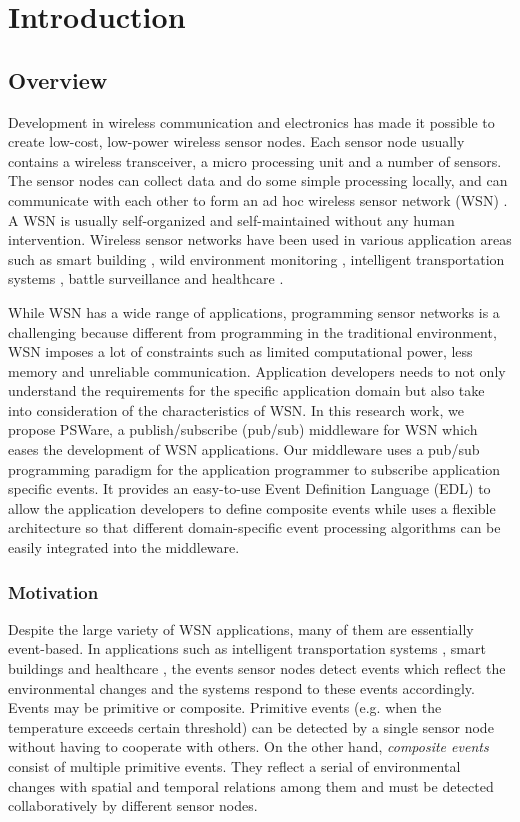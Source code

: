 \chapter{Introduction}
\section{Overview}
\label{sec:introduction}
Development in wireless communication and electronics has made it possible to create low-cost, low-power wireless sensor nodes. Each sensor node usually contains a wireless transceiver, a micro processing unit and a number of sensors. The sensor nodes can collect data and do some simple processing locally, and can communicate with each other to form an ad hoc wireless sensor network (WSN) \cite{aky:survey}. A WSN is usually self-organized and self-maintained without any human intervention. Wireless sensor networks have been used in various application areas such as smart building \cite{lynch:shm}, wild environment monitoring \cite{wsnhabitat}, intelligent transportation systems \cite{klein:its}, battle surveillance \cite{wsntracking} and healthcare \cite{lo:ban}. 

While WSN has a wide range of applications, programming sensor networks is a challenging because different from programming in the traditional environment, WSN imposes a lot of constraints such as limited computational power, less memory and unreliable communication. Application developers needs to not only understand the requirements for the specific application domain but also take into consideration of the characteristics of WSN. In this research work, we propose PSWare, a publish/subscribe (pub/sub) middleware for WSN which eases the development of WSN applications. Our middleware uses a pub/sub programming paradigm for the application programmer to subscribe application specific events. It provides an easy-to-use Event Definition Language (EDL) to allow the application developers to define composite events while uses a flexible architecture so that different domain-specific event processing algorithms can be easily integrated into the middleware.

\subsection{Motivation}
Despite the large variety of WSN applications, many of them are essentially event-based. In applications such as intelligent transportation systems \cite{klein:its}, smart buildings \cite{lynch:shm} and healthcare \cite{lo:ban}, the events sensor nodes detect events which reflect the environmental changes and the systems respond to these events accordingly. Events may be primitive or composite. Primitive events (e.g. when the temperature exceeds certain threshold) can be detected by a single sensor node without having to cooperate with others. On the other hand, \emph{composite events} consist of multiple primitive events. They reflect a serial of environmental changes with spatial and temporal relations among them and must be detected collaboratively by different sensor nodes.

